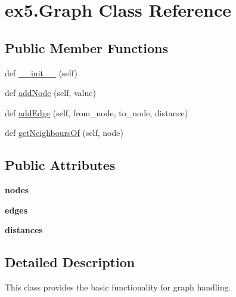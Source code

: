 \hypertarget{classex5_1_1Graph}{}\section{ex5.\+Graph Class Reference}
\label{classex5_1_1Graph}
\subsection*{Public Member Functions}
\begin{DoxyCompactItemize}
\item 
def \hyperlink{classex5_1_1Graph_ae3f8a44804323bdd383a2f8902f91ef0}{\+\_\+\+\_\+init\+\_\+\+\_\+} (self)
\item 
def \hyperlink{classex5_1_1Graph_aa0442e4e52abec627954991690ab4419}{add\+Node} (self, value)
\item 
def \hyperlink{classex5_1_1Graph_a88392665bb6c325a05b24d71b8d089ac}{add\+Edge} (self, from\+\_\+node, to\+\_\+node, distance)
\item 
def \hyperlink{classex5_1_1Graph_ac421c7882a3e2d46d7ad50e85a905df5}{get\+Neighbours\+Of} (self, node)
\end{DoxyCompactItemize}
\subsection*{Public Attributes}
\begin{DoxyCompactItemize}
\item 
{\bfseries nodes}\hypertarget{classex5_1_1Graph_a22104c45c77e3903df629c7cc1395c49}{}\label{classex5_1_1Graph_a22104c45c77e3903df629c7cc1395c49}

\item 
{\bfseries edges}\hypertarget{classex5_1_1Graph_a8a12a3e70e3ee6a59c166986dd714e81}{}\label{classex5_1_1Graph_a8a12a3e70e3ee6a59c166986dd714e81}

\item 
{\bfseries distances}\hypertarget{classex5_1_1Graph_ae93396ce7e7b7517fec4877906311386}{}\label{classex5_1_1Graph_ae93396ce7e7b7517fec4877906311386}

\end{DoxyCompactItemize}


\subsection{Detailed Description}
\begin{DoxyVerb}This class provides the basic functionality for graph handling.\end{DoxyVerb}
 

